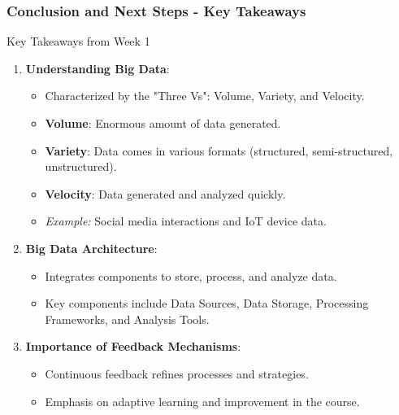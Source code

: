 \documentclass[aspectratio=169]{beamer}
\begin{document}
\begin{frame}[fragile]
    \frametitle{Conclusion and Next Steps - Key Takeaways}
    \begin{block}{Key Takeaways from Week 1}
        \begin{enumerate}
            \item \textbf{Understanding Big Data}:
            \begin{itemize}
                \item Characterized by the "Three Vs": Volume, Variety, and Velocity.
                \item \textbf{Volume}: Enormous amount of data generated.
                \item \textbf{Variety}: Data comes in various formats (structured, semi-structured, unstructured).
                \item \textbf{Velocity}: Data generated and analyzed quickly.
                \item \textit{Example:} Social media interactions and IoT device data.
            \end{itemize}
            
            \item \textbf{Big Data Architecture}:
            \begin{itemize}
                \item Integrates components to store, process, and analyze data.
                \item Key components include Data Sources, Data Storage, Processing Frameworks, and Analysis Tools.
            \end{itemize}
            
            \item \textbf{Importance of Feedback Mechanisms}:
            \begin{itemize}
                \item Continuous feedback refines processes and strategies.
                \item Emphasis on adaptive learning and improvement in the course.
            \end{itemize}
        \end{enumerate}
    \end{block}
\end{frame}
\end{document}

